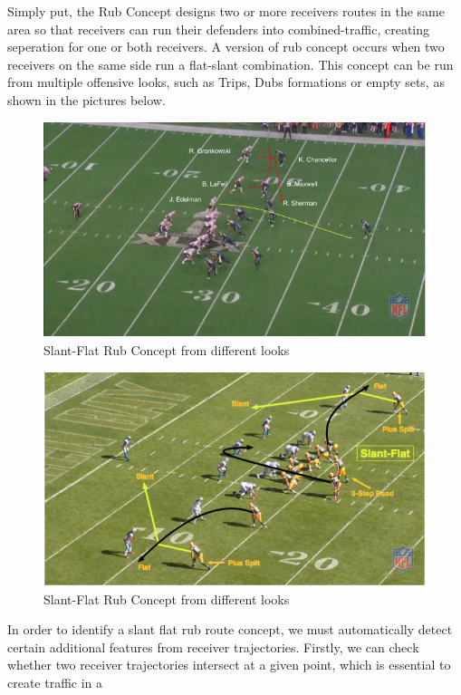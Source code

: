 \documentclass[12pt,oneside]{dukestatscithesis}
\theoremstyle{definition}
\theoremstyle{definition}
\theoremstyle{definition}
\theoremstyle{remark}
\begin{document}
Simply put, the Rub Concept designs two or more receivers routes in the
same area so that receivers can run their defenders into
combined-traffic, creating seperation for one or both receivers. A
version of rub concept occurs when two receivers on the same side run a
flat-slant combination. This concept can be run from multiple offensive
looks, such as Trips, Dubs formations or empty sets, as shown in the
pictures below.
\begin{figure}
\includegraphics[width=8.72in,angle=360, scale=0.5]{figure/rub2} \caption{ Slant-Flat Rub Concept from different looks}\label{fig:rubimages}
\end{figure}\begin{figure}
\includegraphics[width=8.76in,angle=360, scale=0.5]{figure/rub4} \caption{ Slant-Flat Rub Concept from different looks}\label{fig:rubimages}
\end{figure}
In order to identify a slant flat rub route concept, we must
automatically detect certain additional features from receiver
trajectories. Firstly, we can check whether two receiver trajectories
intersect at a given point, which is essential to create traffic in a
\end{document}
